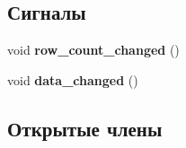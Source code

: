 \subsection*{Сигналы}
\begin{DoxyCompactItemize}
\item 
\hypertarget{class_main_table_widget_a97358bd73d2ad99d0c6c76f347856287}{void {\bfseries row\-\_\-count\-\_\-changed} ()}\label{class_main_table_widget_a97358bd73d2ad99d0c6c76f347856287}

\item 
\hypertarget{class_main_table_widget_a2d5e6c2a84e42a180af5d627142e8ca2}{void {\bfseries data\-\_\-changed} ()}\label{class_main_table_widget_a2d5e6c2a84e42a180af5d627142e8ca2}

\end{DoxyCompactItemize}
\subsection*{Открытые члены}
